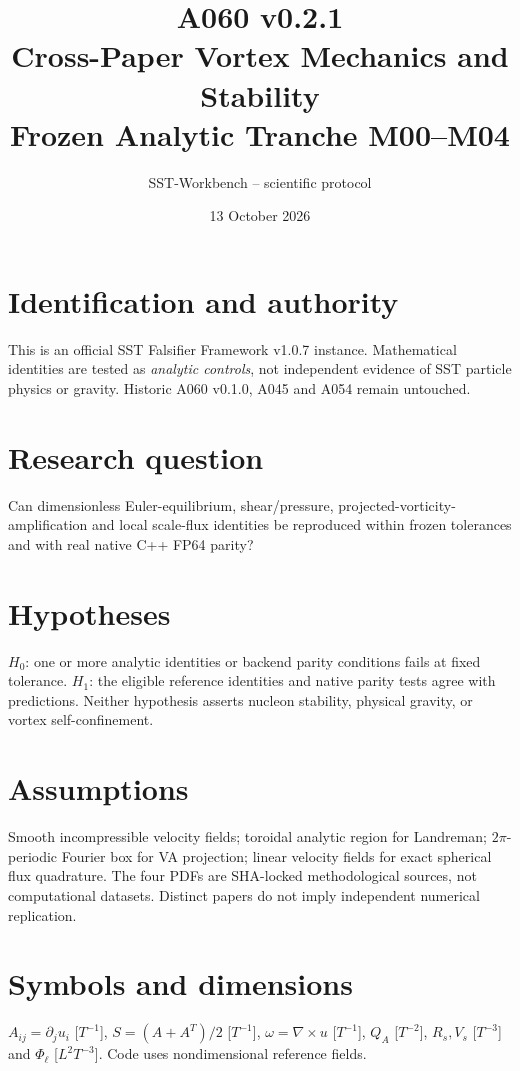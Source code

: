 \documentclass[10pt,a4paper]{article}
\title{A060 v0.2.1\\Cross-Paper Vortex Mechanics and Stability\\Frozen Analytic Tranche M00--M04}
\author{SST-Workbench -- scientific protocol}
\date{13 October 2026}
\begin{document}
\maketitle
\section{Identification and authority}
This is an official SST Falsifier Framework v1.0.7 instance. Mathematical identities are tested as \emph{analytic controls}, not independent evidence of SST particle physics or gravity. Historic A060 v0.1.0, A045 and A054 remain untouched.
\section{Research question}
Can dimensionless Euler-equilibrium, shear/pressure, projected-vorticity-amplification and local scale-flux identities be reproduced within frozen tolerances and with real native C++ FP64 parity?
\section{Hypotheses}
$H_0$: one or more analytic identities or backend parity conditions fails at fixed tolerance. $H_1$: the eligible reference identities and native parity tests agree with predictions. Neither hypothesis asserts nucleon stability, physical gravity, or vortex self-confinement.
\section{Assumptions}
Smooth incompressible velocity fields; toroidal analytic region for Landreman; $2\pi$-periodic Fourier box for VA projection; linear velocity fields for exact spherical flux quadrature. The four PDFs are SHA-locked methodological sources, not computational datasets. Distinct papers do not imply independent numerical replication.
\section{Symbols and dimensions}
$A_{ij}=\partial_j u_i$ [$T^{-1}$], $S=(A+A^T)/2$ [$T^{-1}$], $\omega=\nabla\times u$ [$T^{-1}$], $Q_A$ [$T^{-2}$], $R_s,V_s$ [$T^{-3}$] and $\Phi_\ell$ [$L^2T^{-3}$]. Code uses nondimensional reference fields.
\end{document}
